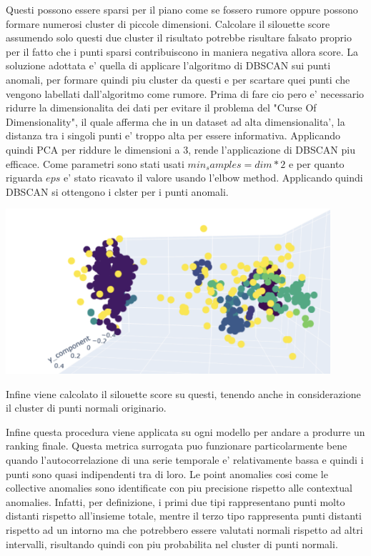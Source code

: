 Questi possono essere sparsi per il piano come se fossero rumore oppure possono formare numerosi cluster di piccole dimensioni. Calcolare il silouette score assumendo solo questi due cluster il risultato potrebbe risultare falsato proprio per il fatto che i punti sparsi contribuiscono in maniera negativa allora score.
La soluzione adottata e' quella di applicare l'algoritmo di DBSCAN sui punti anomali, per formare quindi piu cluster da questi e per scartare quei punti che vengono labellati dall'algoritmo come rumore.
Prima di fare cio pero e' necessario ridurre la dimensionalita dei dati per evitare il problema del "Curse Of Dimensionality", il quale afferma che in un dataset ad alta dimensionalita', la distanza tra i singoli punti e' troppo alta per essere informativa.
Applicando quindi PCA per riddure le dimensioni a 3, rende l'applicazione di DBSCAN piu efficace. Come parametri sono stati usati $min_samples=dim * 2$ e per quanto riguarda $eps$ e' stato ricavato il valore usando l'elbow method.
Applicando quindi DBSCAN si ottengono i clster per i punti anomali.
\begin{center}
\includegraphics[width=12cm, scale=1]{images/plot-dbscan-anomalies}
\end{center}

Infine viene calcolato il silouette score su questi, tenendo anche in considerazione il cluster di punti normali originario.

Infine questa procedura viene applicata su ogni modello per andare a produrre un ranking finale.
Questa metrica surrogata puo funzionare particolarmente bene quando l'autocorrelazione di una serie temporale e' relativamente bassa e quindi i punti sono quasi indipendenti tra di loro. Le point anomalies cosi come le collective anomalies sono identificate con piu precisione rispetto alle contextual anomalies. Infatti, per definizione, i primi due tipi rappresentano punti molto distanti rispetto all'insieme totale, mentre il terzo tipo rappresenta punti distanti rispetto ad un intorno ma che potrebbero essere valutati normali rispetto ad altri intervalli, risultando quindi con piu probabilita nel cluster di punti normali.
